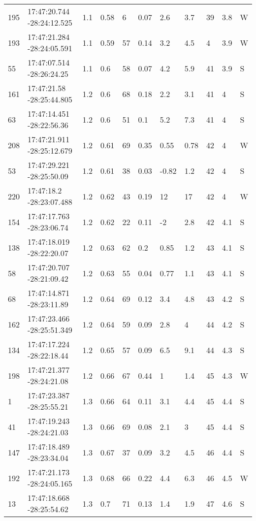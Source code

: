 \begin{deluxetable}[htp]
\begin{tabular}{lllllllllll}
195 & 17:47:20.744 -28:24:12.525 & 1.1 & 0.58 & 6 & 0.07 & 2.6 & 3.7 & 39 & 3.8\ee{24} & W \\
193 & 17:47:21.284 -28:24:05.591 & 1.1 & 0.59 & 57 & 0.14 & 3.2 & 4.5 & 4 & 3.9\ee{24} & W \\
55 & 17:47:07.514 -28:26:24.25 & 1.1 & 0.6 & 58 & 0.07 & 4.2 & 5.9 & 41 & 3.9\ee{24} & S \\
161 & 17:47:21.58 -28:25:44.805 & 1.2 & 0.6 & 68 & 0.18 & 2.2 & 3.1 & 41 & 4\ee{24} & S \\
63 & 17:47:14.451 -28:22:56.36 & 1.2 & 0.6 & 51 & 0.1 & 5.2 & 7.3 & 41 & 4\ee{24} & S \\
208 & 17:47:21.911 -28:25:12.679 & 1.2 & 0.61 & 69 & 0.35 & 0.55 & 0.78 & 42 & 4\ee{24} & W \\
53 & 17:47:29.221 -28:25:50.09 & 1.2 & 0.61 & 38 & 0.03 & -0.82 & 1.2 & 42 & 4\ee{24} & S \\
220 & 17:47:18.2 -28:23:07.488 & 1.2 & 0.62 & 43 & 0.19 & 12 & 17 & 42 & 4\ee{24} & W \\
154 & 17:47:17.763 -28:23:06.74 & 1.2 & 0.62 & 22 & 0.11 & -2 & 2.8 & 42 & 4.1\ee{24} & S \\
138 & 17:47:18.019 -28:22:20.07 & 1.2 & 0.63 & 62 & 0.2 & 0.85 & 1.2 & 43 & 4.1\ee{24} & S \\
58 & 17:47:20.707 -28:21:09.42 & 1.2 & 0.63 & 55 & 0.04 & 0.77 & 1.1 & 43 & 4.1\ee{24} & S \\
68 & 17:47:14.871 -28:23:11.89 & 1.2 & 0.64 & 69 & 0.12 & 3.4 & 4.8 & 43 & 4.2\ee{24} & S \\
162 & 17:47:23.466 -28:25:51.349 & 1.2 & 0.64 & 59 & 0.09 & 2.8 & 4 & 44 & 4.2\ee{24} & S \\
134 & 17:47:17.224 -28:22:18.44 & 1.2 & 0.65 & 57 & 0.09 & 6.5 & 9.1 & 44 & 4.3\ee{24} & S \\
198 & 17:47:21.377 -28:24:21.08 & 1.2 & 0.66 & 67 & 0.44 & 1 & 1.4 & 45 & 4.3\ee{24} & W \\
1 & 17:47:23.387 -28:25:55.21 & 1.3 & 0.66 & 64 & 0.11 & 3.1 & 4.4 & 45 & 4.4\ee{24} & S \\
41 & 17:47:19.243 -28:24:21.03 & 1.3 & 0.66 & 69 & 0.08 & 2.1 & 3 & 45 & 4.4\ee{24} & S \\
147 & 17:47:18.489 -28:23:34.04 & 1.3 & 0.67 & 37 & 0.09 & 3.2 & 4.5 & 46 & 4.4\ee{24} & S \\
192 & 17:47:21.173 -28:24:05.165 & 1.3 & 0.68 & 66 & 0.22 & 4.4 & 6.3 & 46 & 4.5\ee{24} & W \\
13 & 17:47:18.668 -28:25:54.62 & 1.3 & 0.7 & 71 & 0.13 & 1.4 & 1.9 & 47 & 4.6\ee{24} & S \\

\end{tabular}
\end{deluxetable}
